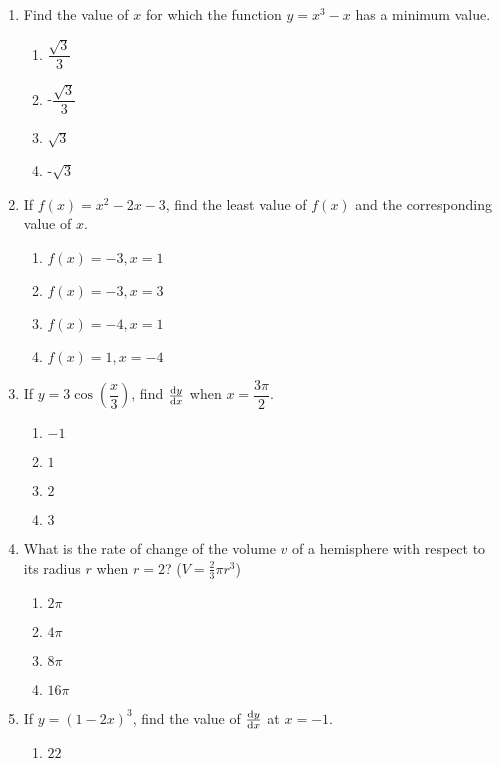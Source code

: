 \begin{multicols}{2}
\begin{enumerate}[label={\arabic*.}]
\begin{enumerate}[label={\Alph*.}]
      \end{enumerate}
    \item Find the value of \(x\) for which the function \(y = {x}^{3} - x\) has a minimum value.
      \begin{enumerate}[label={\Alph*.}]
        \item \(\dfrac{\sqrt{3}}{3}\)
        \item -\(\dfrac{\sqrt{3}}{3}\)
        \item \(\sqrt{3}\)
        \item -\(\sqrt{3}\)
      \end{enumerate}
    \item If \(f(x) = {x}^{2} - 2x - 3\), find the least value of \(f(x)\) and the corresponding value of \(x\).
      \begin{enumerate}[label={\Alph*.}]
        \item \(f(x) = -3, x = 1\)
        \item \(f(x) = -3, x = 3\)
        \item \(f(x) = -4, x = 1\)
        \item \(f(x) = 1, x = -4\)
      \end{enumerate}
    \item If \(y = 3 \cos\left(\dfrac{x}{3}\right)\), find \(\frac{\mathrm{d}y}{\mathrm{d}x}\) when \(x = \dfrac{3\pi}{2}\).
      \begin{enumerate}[label={\Alph*.}]
        \item \(-1\)
        \item \(1\)
        \item \(2\)
        \item  \(3\)
      \end{enumerate}
    \item What is the rate of change of the volume \(v\) of a hemisphere with respect to its radius \(r\) when \(r = 2\)? (\(V=\frac{2}{3}\pi r^3\))
      \begin{enumerate}[label={\Alph*.}]
        \item  \(2\pi\)
        \item  \(4\pi\)
        \item  \(8\pi\)
        \item  \(16\pi\)
      \end{enumerate}
    \item If \(y = {(1-2x)}^3\), find the value of \(\frac{\mathrm{d}y}{\mathrm{d}x}\) at \(x = -1\).
      \begin{enumerate}[label={\Alph*.}]
        \item \(22\)

\end{enumerate}
\end{enumerate}
\end{multicols}
